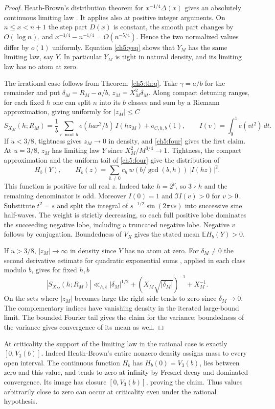 \documentclass[11pt,a4paper,oneside,openany]{report}
\theoremstyle{remark}\newtheorem{remark}[theorem]{Remark}
\numberwithin{equation}{section}
\newcommand{\EE}{\mathbb E}\newcommand{\T}{\mathbb R/\mathbb Z}
\begin{document}
\begin{proof}
Heath-Brown's distribution theorem for $x^{-1/4}\Delta(x)$ gives an absolutely continuous limiting law \cite{hb}. It applies also at positive integer arguments. On $n\le x<n+1$ the step part $D(x)$ is constant, the smooth part changes by $O(\log n)$, and $x^{-1/4}-n^{-1/4}=O(n^{-5/4})$. Hence the two normalized values differ by $o(1)$ uniformly. Equation \eqref{ch5:yeq} shows that $Y_M$ has the same limiting law, say $Y$. In particular $Y_M$ is tight in natural density, and its limiting law has no atom at zero.

The irrational case follows from Theorem~\ref{ch5:th:q}. Take $\gamma=a/b$ for the remainder and put $\delta_M=R_M-a/b$, $z_M=X_M^2\delta_M$. Along compact detuning ranges, for each fixed $h$ one can split $n$ into its $b$ classes and sum by a Riemann approximation, giving uniformly for $|z_M|\le C$
\[
 S_{X_M}(h;R_M)
 =\frac1b\sum_{r\bmod b}e(ha r^2/b)\, I(hz_M)+o_{C,h,b}(1),\qquad
 I(v)=\int_0^1e(vt^2)\,dt.
\]
If $u<3/8$, tightness gives $z_M\to0$ in density, and \eqref{ch5:four} gives the first claim. At $u=3/8$, $z_M$ has limiting law $Y$ since $X_M^2/M^{3/4}\to1$. Tightness, the compact approximation and the uniform tail of \eqref{ch5:four} give the distribution of
\begin{equation}\label{ch5:critprofile}
 H_b(Y),\qquad H_b(z)=\sum_{h\ne0}c_h\,w(b/\gcd(b,h))\,|I(hz)|^2.
\end{equation}
This function is positive for all real $z$. Indeed take $h=2^\nu$, so $3\nmid h$ and the remaining denominator is odd. Moreover $I(0)=1$ and $\Im I(v)>0$ for $v>0$. Substitute $t^2=s$ and split the integral of $s^{-1/2}\sin(2\pi v s)$ into successive sine half-waves. The weight is strictly decreasing, so each full positive lobe dominates the succeeding negative lobe, including a truncated negative lobe. Negative $v$ follows by conjugation. Boundedness of $V_X$ gives the stated mean $\EE H_b(Y)>0$.

If $u>3/8$, $|z_M|\to\infty$ in density since $Y$ has no atom at zero. For $\delta_M\ne0$ the second derivative estimate for quadratic exponential sums \cite{gk}, applied in each class modulo $b$, gives for fixed $h,b$
\[
 |S_{X_M}(h;R_M)|\ll_{h,b} |\delta_M|^{1/2}
       +(X_M\sqrt{|\delta_M|})^{-1}+X_M^{-1}.
\]
On the sets where $|z_M|$ becomes large the right side tends to zero since $\delta_M\to0$. The complementary indices have vanishing density in the iterated large-bound limit. The bounded Fourier tail gives the claim for the variance; boundedness of the variance gives convergence of its mean as well.
\end{proof}
At criticality the support of the limiting law in the rational case is exactly $[0,V_3(b)]$. Indeed Heath-Brown's entire nonzero density assigns mass to every open interval. The continuous function $H_b$ has $H_b(0)=V_3(b)$, lies between zero and this value, and tends to zero at infinity by Fresnel decay and dominated convergence. Its image has closure $[0,V_3(b)]$, proving the claim. Thus values arbitrarily close to zero can occur at criticality even under the rational hypothesis.
\end{document}
